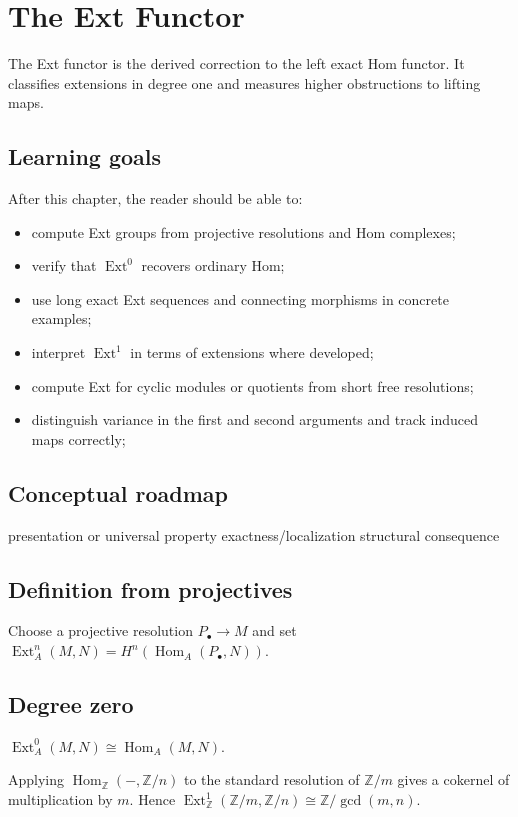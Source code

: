\chapter{The Ext Functor}
\label{ch:v27}

The Ext functor is the derived correction to the left exact Hom functor. It classifies extensions in degree one and measures higher obstructions to lifting maps.

\section*{Learning goals}
After this chapter, the reader should be able to:
\begin{itemize}
\item compute Ext groups from projective resolutions and Hom complexes;
\item verify that \(\operatorname{Ext}^0\) recovers ordinary Hom;
\item use long exact Ext sequences and connecting morphisms in concrete examples;
\item interpret \(\operatorname{Ext}^1\) in terms of extensions where developed;
\item compute Ext for cyclic modules or quotients from short free resolutions;
\item distinguish variance in the first and second arguments and track induced maps correctly;
\end{itemize}
\section*{Conceptual roadmap}
\volroadmap
  {presentation or universal property}
  {exactness/localization}
  {structural consequence}

\section{Definition from projectives}
Choose a projective resolution $P_\bullet\to M$ and set $\operatorname{Ext}_A^n(M,N)=H^n(\operatorname{Hom}_A(P_\bullet,N))$.

\section{Degree zero}
$\operatorname{Ext}_A^0(M,N)\cong\operatorname{Hom}_A(M,N)$.

\begin{example}\label{ex:v27-expand-01}
Applying $\operatorname{Hom}_{\mathbb Z}(-,\mathbb Z/n)$ to the standard resolution of $\mathbb Z/m$ gives a cokernel of multiplication by $m$. Hence $\operatorname{Ext}^1_{\mathbb Z}(\mathbb Z/m,\mathbb Z/n)\cong\mathbb Z/\gcd(m,n)$.
\end{example}

